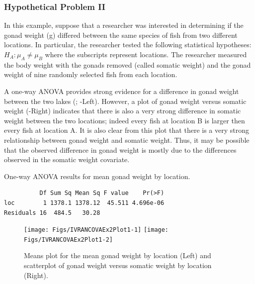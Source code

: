 \documentclass[10pt,openany]{book}\usepackage[]{graphicx}\usepackage[]{color}
\makeatletter
\newenvironment{kframe}{%
 \def\at@end@of@kframe{}%
 \ifinner\ifhmode%
  \def\at@end@of@kframe{\end{minipage}}%
  \begin{minipage}{\columnwidth}%
 \fi\fi%
 \def\FrameCommand##1{\hskip\@totalleftmargin \hskip-\fboxsep
 \colorbox{shadecolor}{##1}\hskip-\fboxsep
     \hskip-\linewidth \hskip-\@totalleftmargin \hskip\columnwidth}%
 \MakeFramed {\advance\hsize-\width
   \@totalleftmargin\z@ \linewidth\hsize
   \@setminipage}}%
 {\par\unskip\endMakeFramed%
 \at@end@of@kframe}
\newenvironment{knitrout}{}{} %
\makeatother
\begin{document}

\subsubsection*{Hypothetical Problem II}
In this example, suppose that a researcher was interested in determining if the gonad weight (g) differed between the same species of fish from two different locations.  In particular, the researcher tested the following statistical hypotheses: $H_{A}: \mu_{A}\neq\mu_{B}$ where the subscripts represent locations.  The researcher measured the body weight with the gonads removed (called somatic weight) and the gonad weight of nine randomly selected fish from each location.

A one-way ANOVA provides strong evidence for a difference in gonad weight between the two lakes (; -Left).  However, a plot of gonad weight versus somatic weight (-Right) indicates that there is also a very strong difference in somatic weight between the two locations; indeed every fish at location B is larger then every fish at location A.  It is also clear from this plot that there is a very strong relationship between gonad weight and somatic weight.  Thus, it may be possible that the observed difference in gonad weight is mostly due to the differences observed in the somatic weight covariate.

\begin{table}[h]
  \centering
  \caption{One-way ANOVA results for mean gonad weight by location.}\label{tab:IVRANCOVAEx2Res1}
\begin{knitrout}
\color{fgcolor}\begin{kframe}
\begin{verbatim}
          Df Sum Sq Mean Sq F value    Pr(>F)
loc        1 1378.1 1378.12  45.511 4.696e-06
Residuals 16  484.5   30.28                  
\end{verbatim}
\end{kframe}
\end{knitrout}
\end{table}

\begin{knitrout}
\color{fgcolor}\begin{figure}[h]

{\centering \texttt{[image: Figs/IVRANCOVAEx2Plot1-1]} 
\texttt{[image: Figs/IVRANCOVAEx2Plot1-2]} 

}

\caption[Means plot for the mean gonad weight by location (Left) and scatterplot of gonad weight versus somatic weight by location (Right)]{Means plot for the mean gonad weight by location (Left) and scatterplot of gonad weight versus somatic weight by location (Right).}\label{fig:IVRANCOVAEx2Plot1}
\end{figure}


\end{knitrout}
\end{document}
